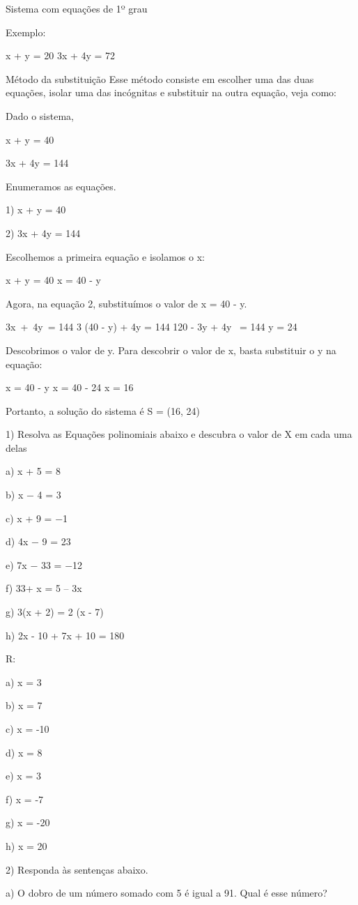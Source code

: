 Sistema com equações de 1º grau

Exemplo:

x + y = 20 3x + 4y = 72

Método da substituição Esse método consiste em escolher uma das duas
equações, isolar uma das incógnitas e substituir na outra equação, veja
como:

Dado o sistema,

x + y = 40

3x + 4y = 144

Enumeramos as equações.

1) x + y = 40

2) 3x + 4y = 144

Escolhemos a primeira equação e isolamos o x:

x + y = 40 x = 40 - y

Agora, na equação 2, substituímos o valor de x = 40 - y.

3x~+~4y~= 144 3 (40 - y) + 4y = 144 120 - 3y + 4y~ = 144 y = 24

Descobrimos o valor de y. Para descobrir o valor de x, basta substituir
o y na equação:

x = 40 - y x = 40 - 24 x = 16

Portanto, a solução do sistema é S = (16, 24)


1) Resolva as Equações polinomiais abaixo e descubra o valor de X em
cada uma delas

a) x + 5 = 8

b) x − 4 = 3

c) x + 9 = −1

d) 4x − 9 = 23

e) 7x − 33 = −12

f) 33+ x = 5 -- 3x

g) 3(x + 2) = 2 (x - 7)

h) 2x - 10 + 7x + 10 = 180

R:

a) x = 3

b) x = 7

c) x = -10

d) x = 8

e) x = 3

f) x = -7

g) x = -20

h) x = 20

2) Responda às sentenças abaixo.

a) O dobro de um número somado com 5 é igual a 91. Qual é esse número?

